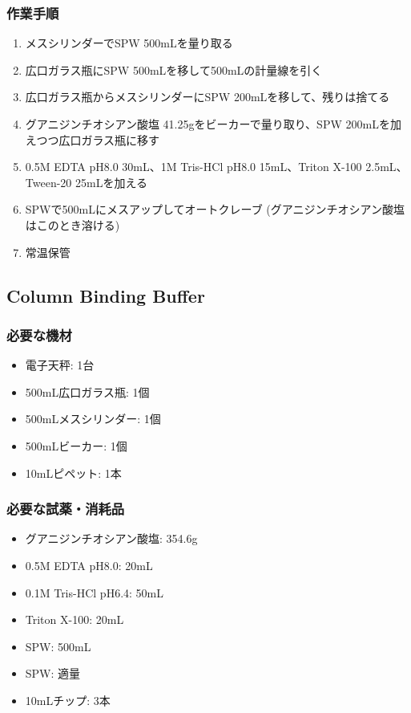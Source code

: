 \documentclass[titlepage,10pt,a4paper]{jsbook}
\begin{document}
\subsubsection{作業手順}
\begin{enumerate}
\item メスシリンダーでSPW 500mLを量り取る
\item 広口ガラス瓶にSPW 500mLを移して500mLの計量線を引く
\item 広口ガラス瓶からメスシリンダーにSPW 200mLを移して、残りは捨てる
\item グアニジンチオシアン酸塩 41.25gをビーカーで量り取り、SPW 200mLを加えつつ広口ガラス瓶に移す
\item 0.5M EDTA pH8.0 30mL、1M Tris-HCl pH8.0 15mL、Triton X-100 2.5mL、Tween-20 25mLを加える
\item SPWで500mLにメスアップしてオートクレーブ (グアニジンチオシアン酸塩はこのとき溶ける)
\item 常温保管
\end{enumerate}

\subsection{Column Binding Buffer}

\subsubsection{必要な機材}
\begin{itemize}
\item 電子天秤: 1台
\item 500mL広口ガラス瓶: 1個
\item 500mLメスシリンダー: 1個
\item 500mLビーカー: 1個
\item 10mLピペット: 1本
\end{itemize}

\subsubsection{必要な試薬・消耗品}
\begin{itemize}
\item グアニジンチオシアン酸塩: 354.6g
\item 0.5M EDTA pH8.0: 20mL
\item 0.1M Tris-HCl pH6.4: 50mL
\item Triton X-100: 20mL
\item SPW: 500mL
\item SPW: 適量
\item 10mLチップ: 3本
\end{itemize}
\end{document}
